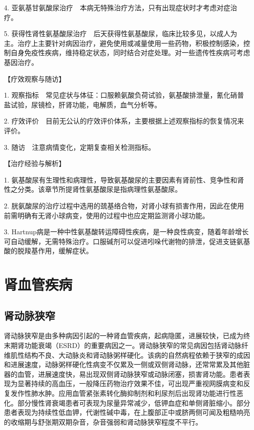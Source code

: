 4.
亚氨基甘氨酸尿治疗　本病无特殊治疗方法，只有出现症状时才考虑对症治疗。

5.
获得性肾性氨基酸尿治疗　后天获得性氨基酸尿，临床比较多见，以成人为主。治疗上主要针对病因治疗，避免使用或减量使用一些药物，积极控制感染，控制自身免疫性疾病，维持稳定状态，同时结合对症处理。对一些遗传性疾病可考虑基因治疗。

【疗效观察与随访】

1.
观察指标　常见症状与体征：口服赖氨酸负荷试验，氨基酸排泄量，氰化硝普盐试验，尿镜检，肝肾功能，电解质，血气分析等。

2.
疗效评价　目前无公认的疗效评价体系，主要根据上述观察指标的恢复情况来评价。

3. 随访　注意病情变化，定期复查相关检测指标。

【治疗经验与解析】

1.
氨基酸尿有生理性和病理性，导致氨基酸尿的主要因素有肾前性、竞争性和肾性之分类。该章节所提肾性氨基酸尿是指病理性氨基酸尿。

2.
胱氨酸尿的治疗过程中选用的巯基络合物，对肾小球有损害作用，因此在使用前需明确有无肾小球病变，使用的过程中也应定期监测肾小球功能。

3.
Hartnup病是一种中性氨基酸转运障碍性疾病，是一种良性病变，随着年龄增长可自动缓解，无需特殊治疗。口服碱剂可以促进吲哚代谢物的排泄，促进支链氨基酸的脱羧基作用，缓解症状。

\section{肾血管疾病}

\subsection{肾动脉狭窄}

肾动脉狭窄是由多种病因引起的一种肾血管疾病，起病隐匿，进展较快，已成为终末期肾功能衰竭（ESRD）的重要病因之一。肾动脉狭窄的常见病因包括肾动脉纤维肌性结构不良、大动脉炎和肾动脉粥样硬化。该病的自然病程依赖于狭窄的成因和进展速度，动脉粥样硬化性病变不仅累及一侧或双侧肾动脉，还常常累及其他脏器的血管，进展速度快，易出现双侧肾动脉狭窄或动脉闭塞，损害肾功能。患者表现为显著持续的高血压，一般降压药物治疗效果不佳，可出现严重视网膜病变和反复发作性肺水肿。应用血管紧张素转化酶抑制剂和利尿剂后出现肾功能进行性恶化。部分慢性肾衰竭患者可表现为尿量异常减少，低钾血症和单侧肾脏缩小。部分患者表现为持续性低血钾，代谢性碱中毒，在上腹部正中或脐两侧可闻及粗糙响亮的收缩期与舒张期双期杂音，杂音强弱和肾动脉狭窄程度不平行。

